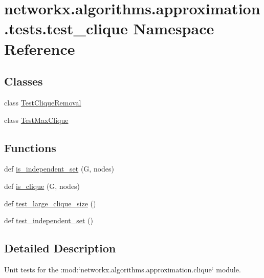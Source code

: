 \hypertarget{namespacenetworkx_1_1algorithms_1_1approximation_1_1tests_1_1test__clique}{}\section{networkx.\+algorithms.\+approximation.\+tests.\+test\+\_\+clique Namespace Reference}
\label{namespacenetworkx_1_1algorithms_1_1approximation_1_1tests_1_1test__clique}
\subsection*{Classes}
\begin{DoxyCompactItemize}
\item 
class \hyperlink{classnetworkx_1_1algorithms_1_1approximation_1_1tests_1_1test__clique_1_1TestCliqueRemoval}{Test\+Clique\+Removal}
\item 
class \hyperlink{classnetworkx_1_1algorithms_1_1approximation_1_1tests_1_1test__clique_1_1TestMaxClique}{Test\+Max\+Clique}
\end{DoxyCompactItemize}
\subsection*{Functions}
\begin{DoxyCompactItemize}
\item 
def \hyperlink{namespacenetworkx_1_1algorithms_1_1approximation_1_1tests_1_1test__clique_a889714835d3ac0a154fe689b2dc68151}{is\+\_\+independent\+\_\+set} (G, nodes)
\item 
def \hyperlink{namespacenetworkx_1_1algorithms_1_1approximation_1_1tests_1_1test__clique_a4f23af2c29a61b864728b50038d33a1c}{is\+\_\+clique} (G, nodes)
\item 
def \hyperlink{namespacenetworkx_1_1algorithms_1_1approximation_1_1tests_1_1test__clique_abacd5d6a539c1a178db90bc090a4b31f}{test\+\_\+large\+\_\+clique\+\_\+size} ()
\item 
def \hyperlink{namespacenetworkx_1_1algorithms_1_1approximation_1_1tests_1_1test__clique_a2d7cf380d181364657e3ed933940e8b6}{test\+\_\+independent\+\_\+set} ()
\end{DoxyCompactItemize}


\subsection{Detailed Description}
\begin{DoxyVerb}Unit tests for the :mod:`networkx.algorithms.approximation.clique` module.\end{DoxyVerb}
 


